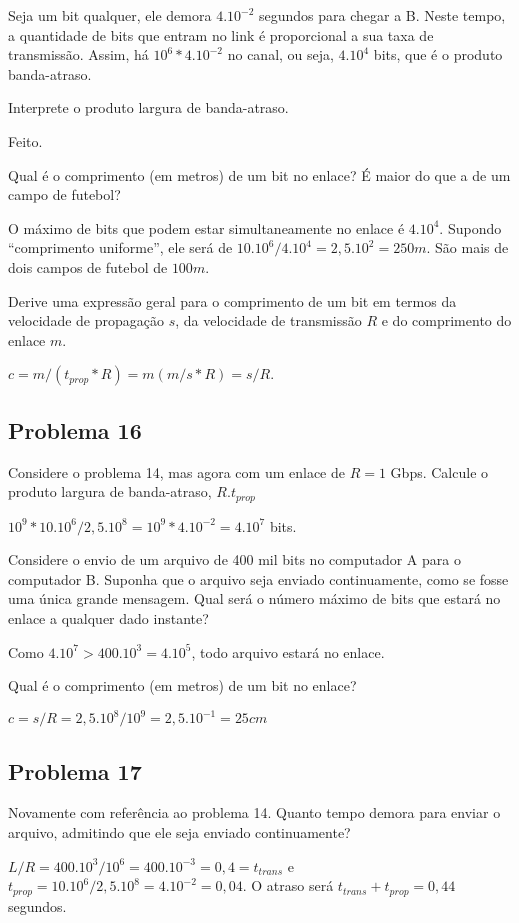 Seja um bit qualquer, ele demora $4 . 10^{-2}$ segundos para chegar a B. Neste tempo, a quantidade de bits que entram no link é proporcional a sua taxa de transmissão.
Assim, há $10^6 * 4 . 10^{-2}$ no canal, ou seja, $4 . 10^4$ bits, que é o produto banda-atraso.

 Interprete o produto largura de banda-atraso.

Feito.

 Qual é o comprimento (em metros) de um bit no enlace? É maior do que a de um campo de futebol?

O máximo de bits que podem estar simultaneamente no enlace é $4. 10^4$. Supondo ``comprimento uniforme'', ele será de $10 . 10^6 / 4.10^4 = 2,5.10^2 = 250m$. São mais de dois campos de futebol de $100m$.

 Derive uma expressão geral para o comprimento de um bit em termos da velocidade de propagação $s$, da velocidade de transmissão $R$ e do comprimento do enlace $m$.

$c = m/(t_{prop} * R) = m(m/s * R) = s/R$.

\subsection{Problema 16}
Considere o problema 14, mas agora com um enlace de $R = 1$ Gbps.
 Calcule o produto largura de banda-atraso, $R . t_{prop}$

$10^9 * 10.10^6 / 2,5.10^8 = 10^9 * 4.10^{-2} = 4.10^7$ bits.

 Considere o envio de um arquivo de 400 mil bits no computador A para o computador B. Suponha que o arquivo seja enviado continuamente, como se fosse uma única grande mensagem. Qual será o número máximo de bits que estará no enlace a qualquer dado instante?

Como $4.10^7 > 400.10^3 = 4.10^5$, todo arquivo estará no enlace.

 Qual é o comprimento (em metros) de um bit no enlace?

$ c= s/R = 2,5.10^8/10^9 = 2,5.10^{-1} = 25cm$

\subsection{Problema 17}
Novamente com referência ao problema 14.
 Quanto tempo demora para enviar o arquivo, admitindo que ele seja enviado continuamente?

$L/R = 400.10^3/10^6 = 400.10^{-3} = 0,4 = t_{trans}$ e $t_{prop} = 10.10^6 / 2,5.10^8 = 4.10^{-2} = 0,04$.
O atraso será $t_{trans} + t_{prop} = 0,44$ segundos.

